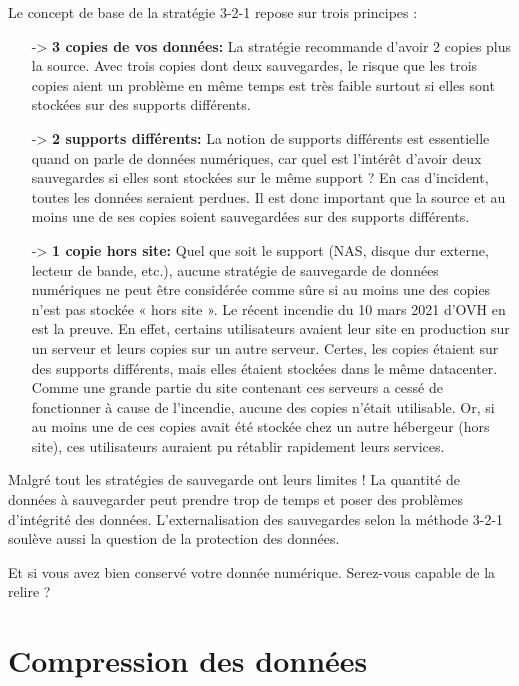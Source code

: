 \documentclass[11pt, a4paper]{book}
\begin{document}
Le concept de base de la stratégie 3-2-1 repose sur trois principes :
\begin{enumerate}
    \item[->] \textbf{{\huge 3} copies de vos données:} La stratégie recommande d’avoir 2 copies plus la source. Avec trois copies dont deux sauvegardes, le risque que les trois copies aient un problème en même temps est très faible surtout si elles sont stockées sur des supports différents.

    \item[->] \textbf{{\huge 2} supports différents:} La notion de supports différents est essentielle quand on parle de données numériques, car quel est l’intérêt d’avoir deux sauvegardes si elles sont stockées sur le même support ? En cas d’incident, toutes les données seraient perdues. Il est donc important que la source et au moins une de ses copies soient sauvegardées sur des supports différents.

    \item[->] \textbf{{\huge 1} copie hors site:} Quel que soit le support (NAS, disque dur externe, lecteur de bande, etc.), aucune stratégie de sauvegarde de données numériques ne peut être considérée comme sûre si au moins une des copies n’est pas stockée « hors site ». Le récent incendie du 10 mars 2021 d’OVH en est la preuve. En effet, certains utilisateurs avaient leur site en production sur un serveur et leurs copies sur un autre serveur. Certes, les copies étaient sur des supports différents, mais elles étaient stockées dans le même datacenter. Comme une grande partie du site contenant ces serveurs a cessé de fonctionner à cause de l’incendie, aucune des copies n’était utilisable. Or, si au moins une de ces copies avait été stockée chez un autre hébergeur (hors site), ces utilisateurs auraient pu rétablir rapidement leurs services.
\end{enumerate}

Malgré tout les stratégies de sauvegarde ont leurs limites ! La quantité de données à sauvegarder peut prendre trop de temps et poser des problèmes d’intégrité des données. L’externalisation des sauvegardes selon la méthode 3-2-1 soulève aussi la question de la protection des données. 

Et si vous avez bien conservé votre donnée numérique. Serez-vous capable de la relire ?

\section{Compression des données}
\end{document}
